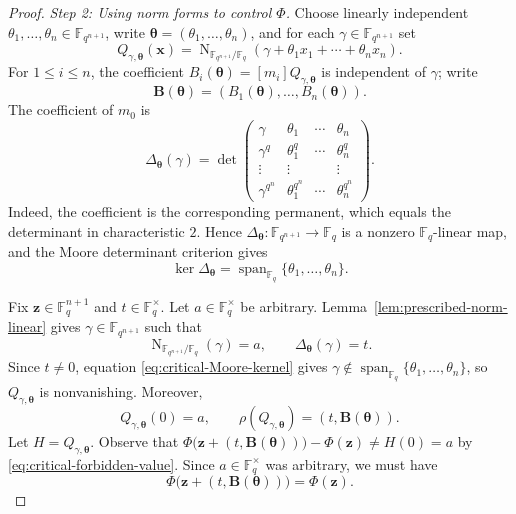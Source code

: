 \documentclass[12pt,reqno]{amsart}
\theoremstyle{definition}
\newcommand{\Nm}{\operatorname{N}}
\newcommand{\F}{\mathbb{F}}
\newcommand{\Span}{\operatorname{span}}
\begin{document}
\begin{proof}
\smallskip

\noindent\emph{Step 2: Using norm forms to control $\Phi$.}
Choose linearly independent
$\theta_1,\ldots,\theta_n\in\F_{q^{n+1}}$, write
$\boldsymbol\theta=(\theta_1,\ldots,\theta_n)$, and for each $\gamma\in\F_{q^{n+1}}$ set
\[
  Q_{\gamma,\boldsymbol\theta}(\mathbf x)
  =
  \Nm_{\F_{q^{n+1}}/\F_q}
  (\gamma+\theta_1x_1+\cdots+\theta_nx_n).
\]
For $1\leq i\leq n$, the coefficient $B_i(\boldsymbol\theta) =[m_i]Q_{\gamma,\boldsymbol\theta}$ is independent of $\gamma$; write
\[\mathbf B(\boldsymbol\theta)
=(B_1(\boldsymbol\theta),\ldots,B_n(\boldsymbol\theta)).
\]
The coefficient of $m_0$ is
\begin{equation}\label{eq:critical-Moore}
  \Delta_{\boldsymbol\theta}(\gamma)
  =
  \det
  \begin{pmatrix}
   \gamma&\theta_1&\cdots&\theta_n\\
   \gamma^q&\theta_1^q&\cdots&\theta_n^q\\
   \vdots&\vdots&&\vdots\\
   \gamma^{q^n}&\theta_1^{q^n}&\cdots&\theta_n^{q^n}
  \end{pmatrix}.
\end{equation}
Indeed, the coefficient is the corresponding permanent, which equals
the determinant in characteristic $2$. Hence $\Delta_{\boldsymbol\theta}:\F_{q^{n+1}}\to\F_q$ is a nonzero
$\F_q$-linear map, and the Moore determinant criterion \cite{Moo96} gives
\begin{equation}\label{eq:critical-Moore-kernel}
  \ker\Delta_{\boldsymbol\theta}
  =\Span_{\F_q}\{\theta_1,\ldots,\theta_n\}.
\end{equation}

Fix $\mathbf z\in\F_q^{n+1}$ and  $t\in\F_q^\times$. Let $a\in\F_q^\times$ be arbitrary.  Lemma~\ref{lem:prescribed-norm-linear} gives $\gamma\in\F_{q^{n+1}}$ such that
\[
  \Nm_{\F_{q^{n+1}}/\F_q}(\gamma)=a,
  \qquad
  \Delta_{\boldsymbol\theta}(\gamma)=t.
\]
Since $t\neq 0$, equation \eqref{eq:critical-Moore-kernel} gives $\gamma\notin\Span_{\F_q}\{\theta_1,\ldots,\theta_n\}$, so
$Q_{\gamma,\boldsymbol\theta}$ is nonvanishing. Moreover,
\[
Q_{\gamma,\boldsymbol\theta}(0)=a, \qquad \rho(Q_{\gamma,\boldsymbol\theta})=(t,\mathbf B(\boldsymbol\theta)).
\]
Let $H=Q_{\gamma,\boldsymbol{\theta}}$. Observe that $\Phi\bigl(\mathbf z+(t,\mathbf B(\boldsymbol\theta))\bigr)-\Phi(\mathbf z)\neq H(0)=a$ by \eqref{eq:critical-forbidden-value}. Since $a\in\F_{q}^{\times}$ was arbitrary, we must have
\begin{equation}\label{eq:critical-Phi-invariance}\Phi\bigl(\mathbf z+(t,\mathbf B(\boldsymbol\theta))\bigr)=\Phi(\mathbf z).
\end{equation}


\end{proof}
\end{document}
